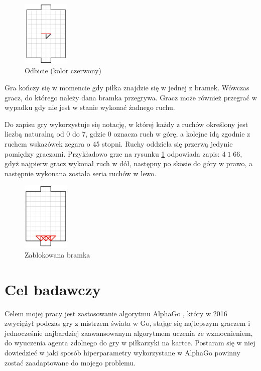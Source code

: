 \documentclass[licencjacka]{pracamgr}
\begin{document}
\begin{figure}[ht]
  \centering
  \includegraphics[width=0.2\textwidth]{odbicie}
  \caption{Odbicie (kolor czerwony)}
  \label{fig:odbicie}
\end{figure}

Gra kończy się w momencie gdy piłka znajdzie się w jednej z bramek.
Wówczas gracz, do którego należy dana bramka przegrywa. 
Gracz może również przegrać w wypadku gdy nie jest w stanie wykonać żadnego ruchu.

Do zapisu gry wykorzystuje się notację, w której każdy z ruchów określony jest liczbą naturalną od 0 do 7, gdzie 0 oznacza ruch w górę, a kolejne idą zgodnie z ruchem wskazówek zegara o 45 stopni. Ruchy oddziela się przerwą jedynie pomiędzy graczami. Przykładowo grze na rysunku \ref{fig:odbicie} odpowiada zapis: $ 4 \;1 \; 66 $, gdyż najpierw gracz wykonał ruch w dół, następny po skosie do góry w prawo, a następnie wykonana została seria ruchów w lewo.

\begin{figure}[ht]
  \centering
  \includegraphics[width=0.2\textwidth]{zablokowanie}
  \caption{Zablokowana bramka}
\end{figure}
 
\section{Cel badawczy} 


Celem mojej pracy jest zastosowanie algorytmu AlphaGo \cite{alphago2016, alphagozero}, który w 2016 zwyciężył podczas gry z mistrzem świata w Go, stając się najlepszym graczem i jednocześnie najbardziej zaawansowanym algorytmem uczenia ze wzmocnieniem, do wyuczenia agenta zdolnego do gry w piłkarzyki na kartce. Postaram się w niej dowiedzieć w jaki sposób hiperparametry wykorzystane w AlphaGo powinny zostać zaadaptowane do mojego problemu. 
\end{document}
